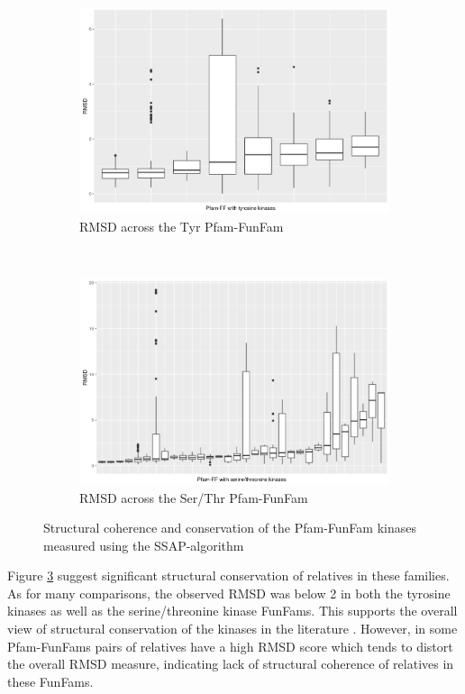 \documentclass[a4paper, 11pt]{article}
\begin{document}
\begin{figure}[H]
\centering
\begin{subfigure}{.8\textwidth}
  \centering
  \includegraphics[width=\linewidth]{figures/ssap_tyr.png}
  \caption{RMSD across the Tyr Pfam-FunFam}
  \label{ssap_tyr}
\end{subfigure}\\
\begin{subfigure}{.8\textwidth}
  \centering
  \includegraphics[width=\linewidth]{figures/ssap_ser.png}
    \caption{RMSD across the Ser/Thr Pfam-FunFam}
  \label{ssap_ser}
\end{subfigure}
\caption{Structural coherence and conservation of the Pfam-FunFam kinases measured using the SSAP-algorithm}
\label{ssap_measure}
\end{figure}
Figure \ref{ssap_measure} suggest significant structural conservation of relatives in these families. As for many comparisons, the observed RMSD was below 2 in both the tyrosine kinases as well as the serine/threonine kinase FunFams. This supports the overall view of structural conservation of the kinases in the literature \cite{manning2002protein, taylor2011protein, elkins2016comprehensive,roskoski2016classification}. However, in some Pfam-FunFams pairs of relatives have a high RMSD score which tends to distort the overall RMSD measure, indicating lack of structural coherence of relatives in these FunFams.\par
\end{document}
